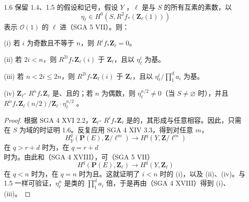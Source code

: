 \begin{SGAresult}{}{1.6}
保留 1.4、1.5 的假设和记号，假设 $Y$ ，$\ell$ 是与 $S$ 的所有互素的素数，以
\[
 \eta_\ell\in H^0(S,R^2f_*(\mathbf Z_\ell(1)))
\]
表示 $\mathcal O(1)$ 的 $\ell$ 进（SGA 5 VII）。则：

(i) 若 $i$ 为奇数且不等于 $n$，则 $R^if_*\mathbf Z_\ell=0$。

(ii) 若 $2i<n$，则 $R^{2i}f_*\mathbf Z_\ell(i)$ 于 $\mathbf Z_\ell$，且以 $\eta_\ell^i$ 为基。

(iii) 若 $n<2i\leq2n$，则 $R^{2i}f_*\mathbf Z_\ell(i)$ 于 $\mathbf Z_\ell$，且以 $\eta_\ell^i/\prod_1^d a_i$ 为基。

(iv) $\mathbf Z_\ell$- $R^nf_*\mathbf Z_\ell$ 是、且的；若 $n$ 为偶数，则 $\eta_\ell^{n/2}\ne0$（当 $S\ne\varnothing$ 时），并且 $R^nf_*\mathbf Z_\ell(n/2)/\mathbf Z_\ell\cdot\eta_\ell^{n/2}$ 。
\end{SGAresult}
\begin{proof}
根据 SGA 4 XVI 2.2，$\mathbf Z_\ell$- $R^if_*\mathbf Z_\ell$ 是的，其形成与任意相容。因此，只需在 $S$ 为域的时证明 1.6。反复应用 SGA 4 XIV 3.3，得到对任意 $m$，
\[
 H_Y^q(\mathbf P(E),\mathbf Z/\ell^m)\longrightarrow H^q(Y,\mathbf Z/\ell^m)
\]
在 $q>r+d$ 时为，在 $q=r+d$ 时为。由此和（SGA 4 XVIII），可（SGA 5 VII）
\[
 H^q(\mathbf P(E),\mathbf Z_\ell)\longrightarrow H^q(Y,\mathbf Z_\ell)
\]
在 $q<n$ 时为，在 $q=n$ 时为且。这就证明了 $i<n$ 时的 (i)，以及 (ii)、(iv)。与 1.5 一样可验证，$\eta_\ell^n$ 是类的 $\prod_1^d a_i$ 倍，于是再由（SGA 4 XVIII）得到 (i)、(iii)。
\end{proof}

